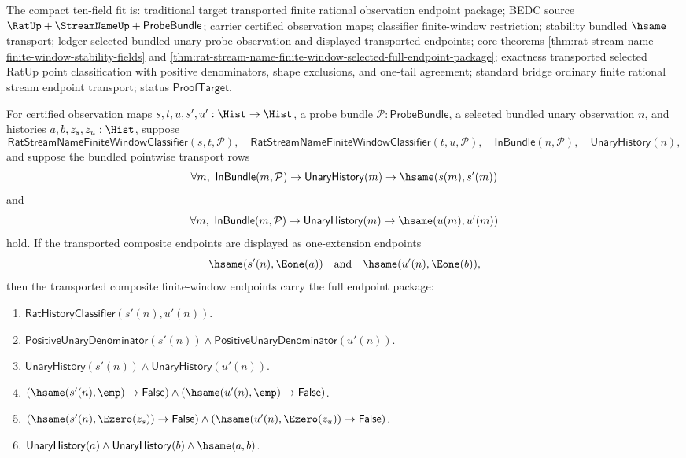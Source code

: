 The compact ten-field fit is: traditional target transported finite rational
observation endpoint package; BEDC source
$\RatUp+\StreamNameUp+\mathsf{ProbeBundle}$; carrier certified observation
maps; classifier finite-window restriction; stability bundled $\hsame$
transport; ledger selected bundled unary probe observation and displayed
transported endpoints; core theorems
\autoref{thm:rat-stream-name-finite-window-stability-fields} and
\autoref{thm:rat-stream-name-finite-window-selected-full-endpoint-package};
exactness transported selected RatUp point classification with positive
denominators, shape exclusions, and one-tail agreement; standard bridge
ordinary finite rational stream endpoint transport; status
$\mathsf{ProofTarget}$.

\begin{theorem}
\label{thm:rat-stream-name-finite-window-transported-composite-endpoint-package}
For certified observation maps $s,t,u,s',u':\Hist\to\Hist$, a probe bundle
$\mathcal{P}:\mathsf{ProbeBundle}$, a selected bundled unary observation $n$,
and histories $a,b,z_s,z_u:\Hist$, suppose
$$
\mathsf{RatStreamNameFiniteWindowClassifier}(s,t,\mathcal{P}),
\quad
\mathsf{RatStreamNameFiniteWindowClassifier}(t,u,\mathcal{P}),
\quad
\mathsf{InBundle}(n,\mathcal{P}),
\quad
\mathsf{UnaryHistory}(n),
$$
and suppose the bundled pointwise transport rows
$$
\forall m,\ \mathsf{InBundle}(m,\mathcal{P})\to
\mathsf{UnaryHistory}(m)\to\hsame(s(m),s'(m))
$$
and
$$
\forall m,\ \mathsf{InBundle}(m,\mathcal{P})\to
\mathsf{UnaryHistory}(m)\to\hsame(u(m),u'(m))
$$
hold. If the transported composite endpoints are displayed as one-extension
endpoints
$$
\hsame(s'(n),\Eone(a))\quad\text{and}\quad \hsame(u'(n),\Eone(b)),
$$
then the transported composite finite-window endpoints carry the full endpoint
package:
\begin{enumerate}
  \item $\mathsf{RatHistoryClassifier}(s'(n),u'(n))$.
  \item $\mathsf{PositiveUnaryDenominator}(s'(n))\land
  \mathsf{PositiveUnaryDenominator}(u'(n))$.
  \item $\mathsf{UnaryHistory}(s'(n))\land\mathsf{UnaryHistory}(u'(n))$.
  \item $(\hsame(s'(n),\emp)\to\mathsf{False})\land
  (\hsame(u'(n),\emp)\to\mathsf{False})$.
  \item $(\hsame(s'(n),\Ezero(z_s))\to\mathsf{False})\land
  (\hsame(u'(n),\Ezero(z_u))\to\mathsf{False})$.
  \item $\mathsf{UnaryHistory}(a)\land\mathsf{UnaryHistory}(b)\land
  \hsame(a,b)$.
\end{enumerate}
\end{theorem}
